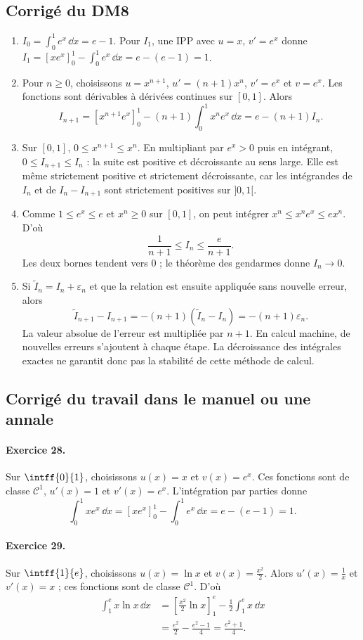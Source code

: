 \subsection{Corrigé du DM8}\begin{enumerate}
\item $I_0=\int_0^1e^x\,\dd x=e-1$. Pour $I_1$, une IPP avec $u=x$, $v'=e^x$ donne $I_1=[xe^x]_0^1-\int_0^1e^x\,\dd x=e-(e-1)=1$.
\item Pour $n\ge0$, choisissons $u=x^{n+1}$, $u'=(n+1)x^n$, $v'=e^x$ et $v=e^x$. Les fonctions sont dérivables à dérivées continues sur $[0,1]$. Alors
\[I_{n+1}=[x^{n+1}e^x]_0^1-(n+1)\int_0^1x^ne^x\,\dd x=e-(n+1)I_n.\]
\item Sur $[0,1]$, $0\le x^{n+1}\le x^n$. En multipliant par $e^x>0$ puis en intégrant, $0\le I_{n+1}\le I_n$ : la suite est positive et décroissante au sens large. Elle est même strictement positive et strictement décroissante, car les intégrandes de $I_n$ et de $I_n-I_{n+1}$ sont strictement positives sur $]0,1[$.
\item Comme $1\le e^x\le e$ et $x^n\ge0$ sur $[0,1]$, on peut intégrer $x^n\le x^ne^x\le ex^n$. D'où
\[\frac1{n+1}\le I_n\le\frac e{n+1}.\]
Les deux bornes tendent vers $0$ ; le théorème des gendarmes donne $I_n\to0$.
\item Si $\widetilde I_n=I_n+\varepsilon_n$ et que la relation est ensuite appliquée sans nouvelle erreur, alors
\[\widetilde I_{n+1}-I_{n+1}=-(n+1)(\widetilde I_n-I_n)=-(n+1)\varepsilon_n.\]
La valeur absolue de l'erreur est multipliée par $n+1$. En calcul machine, de nouvelles erreurs s'ajoutent à chaque étape. La décroissance des intégrales exactes ne garantit donc pas la stabilité de cette méthode de calcul.
\end{enumerate}

\subsection{Corrigé du travail dans le manuel ou une annale}\paragraph{Exercice 28.} Sur $\intff{0}{1}$, choisissons $u(x)=x$ et $v(x)=e^x$. Ces fonctions sont de classe $\mathcal C^1$, $u'(x)=1$ et $v'(x)=e^x$. L'intégration par parties donne
\[\int_0^1xe^x\,\dd x=[xe^x]_0^1-\int_0^1e^x\,\dd x=e-(e-1)=1.\]
\paragraph{Exercice 29.} Sur $\intff{1}{e}$, choisissons $u(x)=\ln x$ et $v(x)=\frac{x^2}2$. Alors $u'(x)=\frac1x$ et $v'(x)=x$ ; ces fonctions sont de classe $\mathcal C^1$. D'où
\[\begin{aligned}\int_1^e x\ln x\,\dd x&=\left[\frac{x^2}2\ln x\right]_1^e-\frac12\int_1^e x\,\dd x\\&=\frac{e^2}2-\frac{e^2-1}4=\frac{e^2+1}4.\end{aligned}\]

\fi

